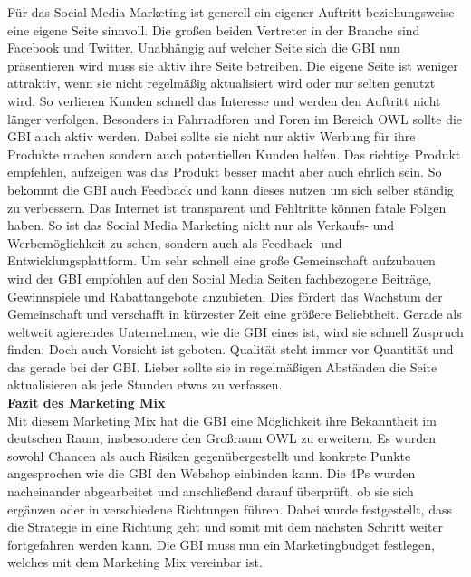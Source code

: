 Für das Social Media Marketing ist generell ein eigener Auftritt beziehungsweise eine eigene Seite sinnvoll. Die großen beiden Vertreter in der Branche sind Facebook und Twitter. Unabhängig auf welcher Seite sich die GBI nun präsentieren wird muss sie aktiv ihre Seite betreiben. Die eigene Seite ist weniger attraktiv, wenn sie nicht regelmäßig aktualisiert wird oder nur selten genutzt wird. So verlieren Kunden schnell das Interesse und werden den Auftritt nicht länger verfolgen. Besonders in Fahrradforen und Foren im Bereich OWL sollte die GBI auch aktiv werden. Dabei sollte sie nicht nur aktiv Werbung für ihre Produkte machen sondern auch potentiellen Kunden helfen. Das richtige Produkt empfehlen, aufzeigen was das Produkt besser macht aber auch ehrlich sein. So bekommt die GBI auch Feedback und kann dieses nutzen um sich selber ständig zu verbessern. Das Internet ist transparent und Fehltritte können fatale Folgen haben. So ist das Social Media Marketing nicht nur als Verkaufs- und Werbemöglichkeit zu sehen, sondern auch als Feedback- und Entwicklungsplattform. Um sehr schnell eine große Gemeinschaft aufzubauen wird der GBI empfohlen auf den Social Media Seiten fachbezogene Beiträge, Gewinnspiele und Rabattangebote anzubieten. Dies fördert das Wachstum der Gemeinschaft und verschafft in kürzester Zeit eine größere Beliebtheit. Gerade als weltweit agierendes Unternehmen, wie die GBI eines ist, wird sie schnell Zuspruch finden. Doch auch Vorsicht ist geboten. Qualität steht immer vor Quantität und das gerade bei der GBI. Lieber sollte sie in regelmäßigen Abständen die Seite aktualisieren als jede Stunden etwas zu verfassen.\\

\small{\textbf{Fazit des Marketing Mix}}\\
Mit diesem Marketing Mix hat die GBI eine Möglichkeit ihre Bekanntheit im deutschen Raum, insbesondere den Großraum OWL zu erweitern. Es wurden sowohl Chancen als auch Risiken gegenübergestellt und konkrete Punkte angesprochen wie die GBI den Webshop einbinden kann. Die 4Ps wurden nacheinander abgearbeitet und anschließend darauf überprüft, ob sie sich ergänzen oder in verschiedene Richtungen führen. Dabei wurde festgestellt, dass die Strategie in eine Richtung geht und somit mit dem nächsten Schritt weiter fortgefahren werden kann.  Die GBI muss nun ein Marketingbudget festlegen, welches mit dem Marketing Mix vereinbar ist.
